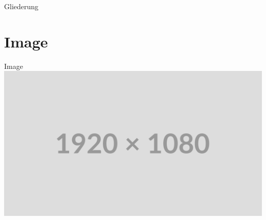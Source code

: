 
\begin{frame}{Gliederung}
    \tableofcontents
\end{frame}



\section{Image}

\begin{frame}{Image}
    \includegraphics[width=\textwidth]{../assets/placeholder.png}
\end{frame}
